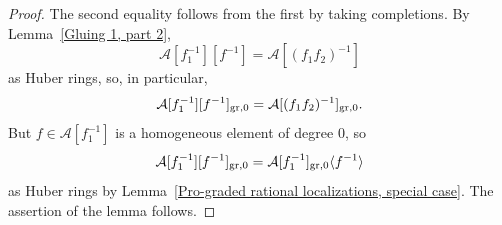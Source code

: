 \documentclass[12pt,twoside,a4paper]{article}
\theoremstyle{definition}
\theoremstyle{remark}
\newcommand\gr{{\rm gr}}
\begin{document}
\begin{proof}The second equality follows from the first by taking completions. By Lemma~\ref{Gluing 1, part 2}, \begin{equation*}\mathcal{A}[f_{1}^{-1}][f^{-1}]=\mathcal{A}[(f_{1}f_{2})^{-1}]\end{equation*}as Huber rings, so, in particular, \begin{equation*}\mathcal{A}[f_{1}^{-1}][f^{-1}]_{\gr,0}=\mathcal{A}[(f_{1}f_{2})^{-1}]_{\gr,0}.\end{equation*}But $f\in \mathcal{A}[f_{1}^{-1}]$ is a homogeneous element of degree $0$, so \begin{equation*}\mathcal{A}[f_{1}^{-1}][f^{-1}]_{\gr,0}=\mathcal{A}[f_{1}^{-1}]_{\gr,0}\langle f^{-1}\rangle\end{equation*}as Huber rings by Lemma~\ref{Pro-graded rational localizations, special case}. The assertion of the lemma follows.\end{proof}
\end{document}
